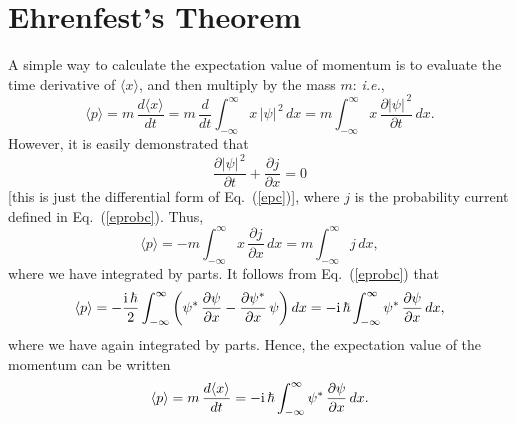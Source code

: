 \section{Ehrenfest's Theorem}\label{s4.5}
A simple way  to calculate the expectation value of
momentum
is to evaluate the time derivative of $\langle x\rangle$, and then
multiply by the mass $m$: {\em i.e.},
\begin{equation}\label{e4.34x}
 \langle p \rangle = m\,\frac{d\langle x\rangle}{dt} = m\,\frac{d}{dt}\int_{-\infty}^{\infty}x\,|\psi|^{\,2}\,dx =m \int_{-\infty}^{\infty}x\,\frac{\partial|\psi|^{\,2}}{\partial t}\,dx.
\end{equation}
However, it is easily demonstrated that
\begin{equation}\label{ediffp}
\frac{\partial|\psi|^{\,2}}{\partial t} + \frac{\partial j}{\partial x} = 0
\end{equation}
[this is just the differential form of Eq.~(\ref{epc})],
where $j$ is the probability current defined in Eq.~(\ref{eprobc}).
Thus,
\begin{equation}
\langle p\rangle = -m\int_{-\infty}^{\infty} x\,\frac{\partial j}{\partial x}\,dx
= m\int_{-\infty}^{\infty}j\,dx,
\end{equation}
where we have integrated by parts. It follows from Eq.~(\ref{eprobc})
that
\begin{equation}
\langle p\rangle = - \frac{{\rm i}\,\hbar}{2}\int_{-\infty}^{\infty}
\left(\psi^\ast\,\frac{\partial\psi}{\partial x} - \frac{\partial\psi^\ast}{\partial x}\,\psi\right)dx = - {\rm i}\,\hbar\int_{-\infty}^{\infty}
\psi^\ast\,\frac{\partial\psi}{\partial x}\,dx,
\end{equation}
where we have again integrated by parts. Hence, the expectation value of the momentum can be written
\begin{equation}\label{e3.38}
\langle p\rangle = m\,\frac{d\langle x\rangle}{dt}= - {\rm i}\,\hbar\int_{-\infty}^{\infty}
\psi^\ast\,\frac{\partial\psi}{\partial x}\,dx.
\end{equation}

